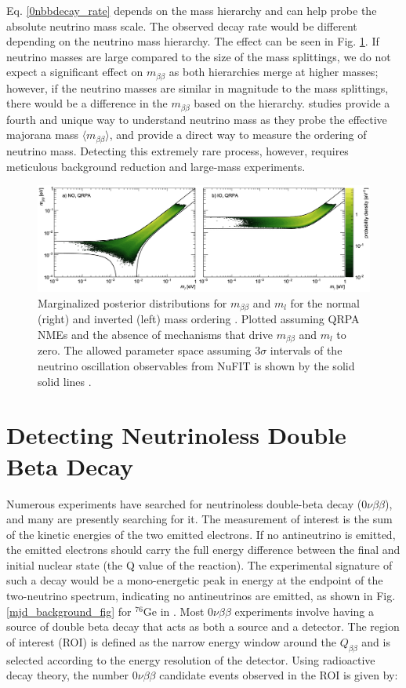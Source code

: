 Eq. \ref{0nbbdecay_rate} depends on the mass hierarchy and can help probe the absolute neutrino mass scale. The observed decay rate would be different depending on the neutrino mass hierarchy. The effect can be seen in Fig. \ref{majorana_mass}. If neutrino masses are large compared to the size of the mass splittings, we do not expect a significant effect on $m_{\beta\beta}$ as both hierarchies merge at higher masses; however, if the neutrino masses are similar in magnitude to the mass splittings, there would be a difference in the $m_{\beta\beta}$ based on the hierarchy. {\onbb} studies provide a fourth and unique way to understand neutrino mass as they probe the effective majorana mass $\langle m_{\beta\beta}\rangle$, and provide a direct way to measure the ordering of neutrino mass. Detecting this extremely rare process, however, requires meticulous background reduction and large-mass experiments.
\begin{figure}
\centering
\includegraphics[width=\linewidth]{ch1/figs/effective_maronana_mass.png}
\caption{Marginalized posterior distributions for $m_{\beta\beta}$ and $m_l$ for the normal (right) and inverted (left) mass ordering \cite{PhysRevD.96.053001}. Plotted assuming QRPA NMEs and the absence of mechanisms that drive $m_{\beta\beta}$ and $m_l$ to zero. The allowed parameter space assuming $3\sigma$ intervals of the neutrino oscillation observables from NuFIT is shown by the solid solid lines \cite{nufit}.}
\label{majorana_mass}
\end{figure}


\section{Detecting Neutrinoless Double Beta Decay}
Numerous experiments have searched for neutrinoless double-beta decay ($0\nu\beta\beta$), and many are presently searching for it. The measurement of interest is the sum of the kinetic energies of the two emitted electrons. If no antineutrino is emitted, the emitted electrons should carry the full energy difference between the final and initial nuclear state (the Q value of the reaction). The experimental signature of such a decay would be a mono-energetic peak in energy at the endpoint of the two-neutrino spectrum, indicating no antineutrinos are emitted, as shown in Fig. \ref{mjd_background_fig} for ${}^{76}\mathrm{Ge}$ in {\MJD}. Most $0\nu\beta\beta$ experiments involve having a source of double beta decay that acts as both a source and a detector. The region of interest (ROI) is defined as the narrow energy window around the $Q_{\beta\beta}$ and is selected according to the energy resolution of the detector. Using radioactive decay theory, the number $0\nu\beta\beta$ candidate events observed in the ROI is given by: %

